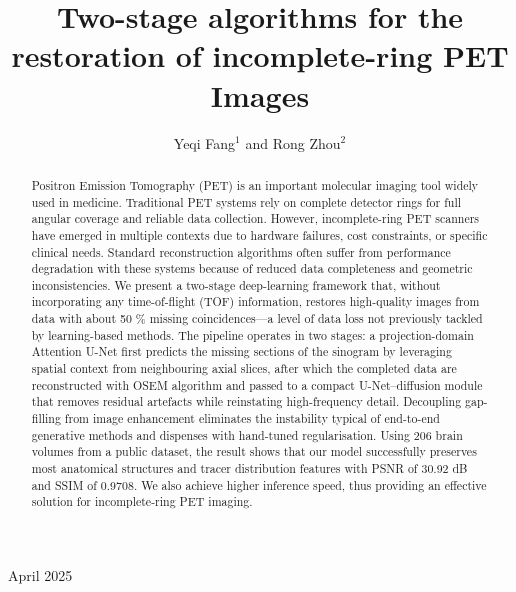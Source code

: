 \documentclass[12pt]{iopart}
\begin{document}
\title{Two-stage algorithms for the restoration of incomplete-ring PET Images}


\author{Yeqi Fang$^1$ and Rong Zhou$^2$}
\address{College of Physics, Sichuan University, Chengdu, 610065, China}

\vspace{10pt}
\begin{indented}
\item[]April 2025
\end{indented}

\begin{abstract}
Positron Emission Tomography (PET) is an important molecular imaging tool widely used in medicine. Traditional PET systems rely on complete detector rings for full angular coverage and reliable data collection. 
However, incomplete-ring PET scanners have emerged in multiple contexts due to hardware failures, cost constraints, or specific clinical needs. Standard reconstruction algorithms often suffer from performance degradation with these systems because of reduced data completeness and geometric inconsistencies.
We present a two-stage deep-learning framework that, without incorporating any time-of-flight (TOF) information, restores high-quality images from data with about 50 \% missing coincidences—a level of data loss not previously tackled by learning-based methods.
The pipeline operates in two stages: a projection-domain Attention U-Net first predicts the missing sections of the sinogram by leveraging spatial context from neighbouring axial slices, after which the completed data are reconstructed with OSEM algorithm and passed to a compact U-Net–diffusion module that removes residual artefacts while reinstating high-frequency detail.
Decoupling gap-filling from image enhancement eliminates the instability typical of end-to-end generative methods and dispenses with hand-tuned regularisation.
Using 206 brain volumes from a public dataset, the result shows that our model successfully preserves most anatomical structures and tracer distribution features with PSNR of 30.92 dB and SSIM of 0.9708. We also achieve higher inference speed, thus providing an effective solution for incomplete-ring PET imaging.


\end{abstract}
\end{document}
